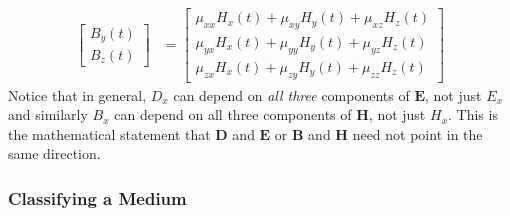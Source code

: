 \begin{itemize}
\begin{align*}
\begin{bmatrix}
        B_y(t) \\
        B_z(t)
      \end{bmatrix}
      &=
      \begin{bmatrix}
        \mu_{xx} H_x(t) + \mu_{xy} H_y(t) + \mu_{xz} H_z(t) \\
        \mu_{yx} H_x(t) + \mu_{yy} H_y(t) + \mu_{yz} H_z(t) \\
        \mu_{zx} H_x(t) + \mu_{zy} H_y(t) + \mu_{zz} H_z(t)
      \end{bmatrix}
    \end{align*}
    Notice that in general, \( D_x \) can depend on \emph{all three} components of
    \( \mathbf{E} \), not just \( E_x \) and similarly \( B_x \) can depend on all three
    components of \( \mathbf{H} \), not just \( H_x \). This is the mathematical statement
    that \( \mathbf{D} \) and \( \mathbf{E} \) or \( \mathbf{B} \) and \( \mathbf{H} \)
    need not point in the same direction.
\end{itemize}

\subsubsection{Classifying a Medium}

